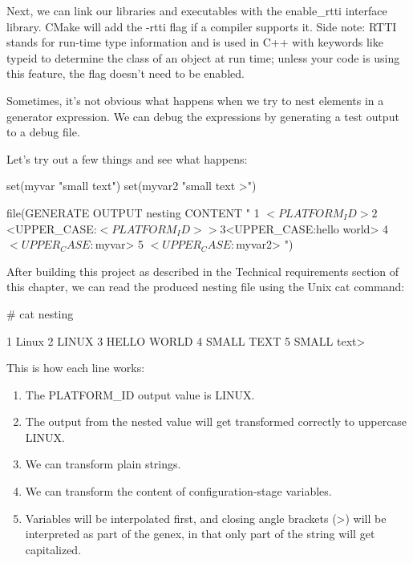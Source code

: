 Next, we can link our libraries and executables with the enable\_rtti interface library. CMake will add the -rtti flag if a compiler supports it. Side note: RTTI stands for run-time type information and is used in C++ with keywords like typeid to determine the class of an object at run time; unless your code is using this feature, the flag doesn’t need to be enabled.


Sometimes, it’s not obvious what happens when we try to nest elements in a generator expression. We can debug the expressions by generating a test output to a debug file.

Let’s try out a few things and see what happens:


\begin{cmake}
set(myvar "small text")
set(myvar2 "small text >")

file(GENERATE OUTPUT nesting CONTENT "
    1 $<PLATFORM_ID>
    2 $<UPPER_CASE:$<PLATFORM_ID>>
    3 $<UPPER_CASE:hello world>
    4 $<UPPER_CASE:${myvar}>
    5 $<UPPER_CASE:${myvar2}>
")
\end{cmake}

After building this project as described in the Technical requirements section of this chapter, we can read the produced nesting file using the Unix cat command:

\begin{shell}
# cat nesting

    1 Linux
    2 LINUX
    3 HELLO WORLD
    4 SMALL TEXT
    5 SMALL text>
\end{shell}

This is how each line works:

\begin{enumerate}
\item
The PLATFORM\_ID output value is LINUX.

\item
The output from the nested value will get transformed correctly to uppercase LINUX.

\item
We can transform plain strings.

\item
We can transform the content of configuration-stage variables.

\item
Variables will be interpolated first, and closing angle brackets (>) will be interpreted as part of the genex, in that only part of the string will get capitalized.
\end{enumerate}

